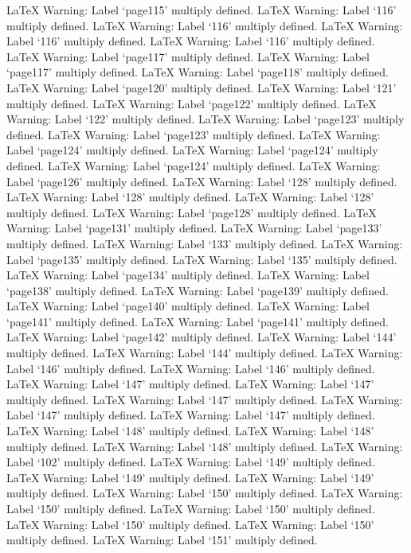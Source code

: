 LaTeX Warning: Label `page115' multiply defined.
LaTeX Warning: Label `116' multiply defined.
LaTeX Warning: Label `116' multiply defined.
LaTeX Warning: Label `116' multiply defined.
LaTeX Warning: Label `116' multiply defined.
LaTeX Warning: Label `page117' multiply defined.
LaTeX Warning: Label `page117' multiply defined.
LaTeX Warning: Label `page118' multiply defined.
LaTeX Warning: Label `page120' multiply defined.
LaTeX Warning: Label `121' multiply defined.
LaTeX Warning: Label `page122' multiply defined.
LaTeX Warning: Label `122' multiply defined.
LaTeX Warning: Label `page123' multiply defined.
LaTeX Warning: Label `page123' multiply defined.
LaTeX Warning: Label `page124' multiply defined.
LaTeX Warning: Label `page124' multiply defined.
LaTeX Warning: Label `page124' multiply defined.
LaTeX Warning: Label `page126' multiply defined.
LaTeX Warning: Label `128' multiply defined.
LaTeX Warning: Label `128' multiply defined.
LaTeX Warning: Label `128' multiply defined.
LaTeX Warning: Label `page128' multiply defined.
LaTeX Warning: Label `page131' multiply defined.
LaTeX Warning: Label `page133' multiply defined.
LaTeX Warning: Label `133' multiply defined.
LaTeX Warning: Label `page135' multiply defined.
LaTeX Warning: Label `135' multiply defined.
LaTeX Warning: Label `page134' multiply defined.
LaTeX Warning: Label `page138' multiply defined.
LaTeX Warning: Label `page139' multiply defined.
LaTeX Warning: Label `page140' multiply defined.
LaTeX Warning: Label `page141' multiply defined.
LaTeX Warning: Label `page141' multiply defined.
LaTeX Warning: Label `page142' multiply defined.
LaTeX Warning: Label `144' multiply defined.
LaTeX Warning: Label `144' multiply defined.
LaTeX Warning: Label `146' multiply defined.
LaTeX Warning: Label `146' multiply defined.
LaTeX Warning: Label `147' multiply defined.
LaTeX Warning: Label `147' multiply defined.
LaTeX Warning: Label `147' multiply defined.
LaTeX Warning: Label `147' multiply defined.
LaTeX Warning: Label `147' multiply defined.
LaTeX Warning: Label `148' multiply defined.
LaTeX Warning: Label `148' multiply defined.
LaTeX Warning: Label `148' multiply defined.
LaTeX Warning: Label `102' multiply defined.
LaTeX Warning: Label `149' multiply defined.
LaTeX Warning: Label `149' multiply defined.
LaTeX Warning: Label `149' multiply defined.
LaTeX Warning: Label `150' multiply defined.
LaTeX Warning: Label `150' multiply defined.
LaTeX Warning: Label `150' multiply defined.
LaTeX Warning: Label `150' multiply defined.
LaTeX Warning: Label `150' multiply defined.
LaTeX Warning: Label `151' multiply defined.
